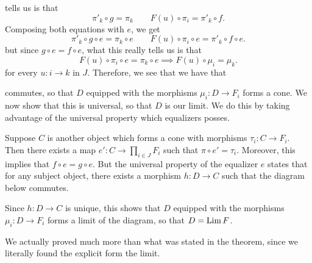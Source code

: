 \begin{prf}
        tells us is that 
        \[
            \pi'_k \circ g = \pi_k \qquad F(u)\circ \pi_i = \pi'_k \circ f.
        \]
        Composing both equations with $e$, we get 
        \[
            \pi'_k \circ g \circ e = \pi_k \circ e \qquad F(u)\circ \pi_i \circ e= \pi'_k \circ f\circ e.
        \]
        but since $g \circ e = f \circ e$, what this really tells us is that
        \[
            F(u) \circ \pi_i \circ e = \pi_k \circ e \implies F(u) \circ \mu_i = \mu_k.
        \]
        for every $u: i \to k$ in $J$. 
        Therefore, we see that we have that 
        \begin{center}
        \end{center}
        commutes, so that $D$ equipped with the morphisms $\mu_i: D \to F_i$ forms a cone.
        We now show that this is universal, so that $D$ is our limit. We do this 
        by taking advantage of the universal property which equalizers
        posses. 
        
        Suppose $C$ is another object which forms a cone with 
        morphisms $\tau_i: C \to F_i$. Then there exists a map
        $\displaystyle e': C \to \prod_{i \in J}F_i$ such that 
        $\pi \circ e' = \tau_i$. Moreover, this implies that 
        $f \circ e = g \circ e$. But the universal property of 
        the equalizer $e$
        states that for any subject object, there exists a morphism 
        $h: D \to C$ such that the diagram below commutes. 
        \begin{center}
        \end{center}
        Since $h: D \to C$ is unique, this shows that $D$ 
        equipped with the morphisms 
        $\displaystyle \mu_i: D \to F_i$ forms a limit of the diagram,
        so that $D = \operatorname*{\mathrm{Lim }} F$.
    \end{prf}
    We actually proved much more than what was stated in the theorem, 
    since we literally found the explicit form the limit. 

